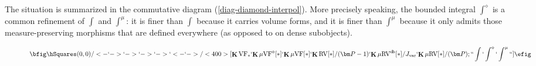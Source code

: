 \documentclass[12pt]{amsart}
\theoremstyle{plain}
\theoremstyle{definition}
\theoremstyle{remark}
\numberwithin{equation}{section}
\theoremstyle{plain}
\newcommand{\VF}{\textup{VF}}
\newcommand{\RV}{\textup{RV}}
\DeclareMathOperator{\id}{id}
\newcommand{\A}{\mathds{A}}
\newcommand{\C}{\mathds{C}}
\newcommand{\0}{\emptyset}
\newcommand{\bb}[1]{\mathbb{#1}}
\newcommand{\mgVF}{{\mu} {\VF}}
\newcommand{\mgRV}{{\mu}{\RV}}
\newcommand{\RES}{\textup{RES}}
\newcommand{\mgRES}{{\mu}{\RES}}
\newcommand{\mgE}{{\mu}{\bb E}}
\DeclareMathOperator{\ggk}{\mathbf{K}}
\DeclareMathOperator{\sggk}{!\mathbf{K}}
\DeclareMathOperator{\db}{d \! b}
\newcommand{\var}{\textup{Var}}
\begin{document}
The situation is summarized in the  commutative diagram (\ref{diag-diamond-interpol}). More precisely speaking, the bounded integral $\int^\diamond$ is a common refinement of $\int$ and $\int^\mu$: it is finer than $\int$ because it carries volume forms, and it is finer than $\int^\mu$ because it only admits those measure-preserving morphisms that are defined everywhere (as opposed to on dense subobjects).
\begin{figure}[htb]
\begin{equation}\label{diag-diamond-interpol}
\bfig
  \hSquares(0,0)/<-`->`->`->`->`<-`->/<400>[{\ggk \VF_*}`{\ggk \mgVF^\diamond[*]}`{\ggk \mgVF[*]}`{\ggk \RV[*] / (\bm P - 1)}`{\ggk \mgRV^{\db}[*] / J_{\mathrm{var}}}`{\ggk \mgRV[*] / (\bm P)}; ``\int`\int^{\diamond}`\int^\mu``]
\efig
\end{equation}
\end{figure}




%
%
\end{document}
